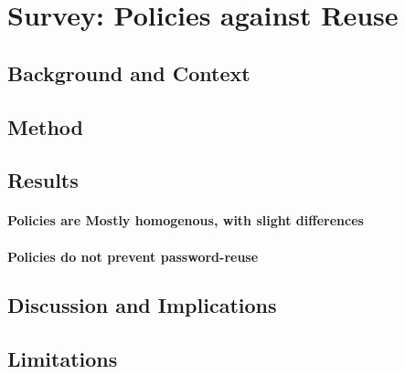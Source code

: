 \chapter[Survey: Policies against Reuse]{Survey: Policies against Reuse}\label{chap:policies-reuse}
\section{Background and Context}
\section{Method}

\section{Results}
\subsubsection{Policies are Mostly homogenous, with slight differences}
\subsubsection{Policies do not prevent password-reuse}

\section{Discussion and Implications}

\section{Limitations}
